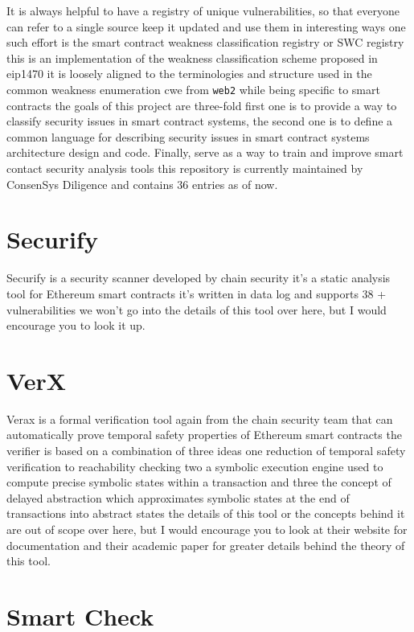 It is always helpful to have a registry of unique vulnerabilities, so that everyone can refer to a single source keep it updated and use them in interesting ways one such effort is the smart contract weakness classification registry or SWC registry this is an implementation of the weakness classification scheme proposed in eip1470 it is loosely aligned to the terminologies and structure used in the common weakness enumeration cwe from \verb|web2| while being specific to smart contracts the goals of this project are three-fold first one is to provide a way to classify security issues in smart contract systems, the second one is to define a common language for describing security issues in smart contract systems architecture design and code. Finally, serve as a way to train and improve smart contact security analysis tools this repository is currently maintained by ConsenSys Diligence and contains 36 entries as of now.

\section{Securify}

Securify is a security scanner developed by chain security it's a static analysis tool for Ethereum smart contracts it's written in data log and supports 38 + vulnerabilities we won't go into the details of this tool over here, but I would encourage you to look it up.

\section{VerX}

Verax is a formal verification tool again from the chain security team that can automatically prove temporal safety properties of Ethereum smart contracts the verifier is based on a combination of three ideas one reduction of temporal safety verification to reachability checking two a symbolic execution engine used to compute precise symbolic states within a transaction and three the concept of delayed abstraction which approximates symbolic states at the end of transactions into abstract states the details of this tool or the concepts behind it are out of scope over here, but I would encourage you to look at their website for documentation and their academic paper for greater details behind the theory of this tool.

\section{Smart Check}

